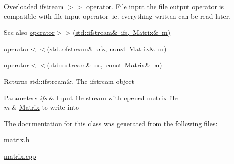 Overloaded ifstream $>$$>$ operator. File input the file output operator is compatible with file input operator, ie. everything written can be read later. \begin{DoxySeeAlso}{See also}
\mbox{\hyperlink{class_matrix_aa5699a0bdf0ee014f083ff8a76629d21}{operator$>$$>$(std\+::ifstream\& ifs, Matrix\& m)}} 

\mbox{\hyperlink{class_matrix_aa574249d63b390cf1108d6e82047ef61}{operator$<$$<$(std\+::ofstream\& ofs, const Matrix\& m)}} 

\mbox{\hyperlink{class_matrix_a060711074cb5bcaf4e75498bc040c4b7}{operator$<$$<$(std\+::ostream\& os, const Matrix\& m)}} 
\end{DoxySeeAlso}
\begin{DoxyReturn}{Returns}
std\+::ifstream\&. The ifstream object 
\end{DoxyReturn}

\begin{DoxyParams}{Parameters}
{\em ifs} & Input file stream with opened matrix file \\
\hline
{\em m} & \mbox{\hyperlink{class_matrix}{Matrix}} to write into \\
\hline
\end{DoxyParams}


The documentation for this class was generated from the following files\+:\begin{DoxyCompactItemize}
\item 
\mbox{\hyperlink{matrix_8h}{matrix.\+h}}\item 
\mbox{\hyperlink{matrix_8cpp}{matrix.\+cpp}}\end{DoxyCompactItemize}
